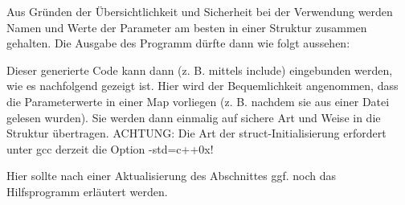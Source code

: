 Aus Gründen der Übersichtlichkeit und Sicherheit bei der Verwendung werden Namen und Werte der Parameter am besten in einer Struktur zusammen gehalten. Die Ausgabe des Programm dürfte dann wie folgt aussehen:

\begin{shaded}
  \scriptsize
  
\end{shaded}

Dieser generierte Code kann dann (z. B. mittels include) eingebunden werden, wie es nachfolgend gezeigt ist. Hier wird der Bequemlichkeit angenommen, dass die Parameterwerte in einer Map vorliegen (z. B. nachdem sie aus einer Datei gelesen wurden). Sie werden dann einmalig auf sichere Art und Weise in die Struktur übertragen. ACHTUNG: Die Art der struct-Initialisierung erfordert unter gcc derzeit die Option -std=c++0x!

\begin{shaded}
  \scriptsize
  
\end{shaded}

Hier sollte nach einer Aktualisierung des Abschnittes ggf. noch das Hilfsprogramm erläutert werden.
